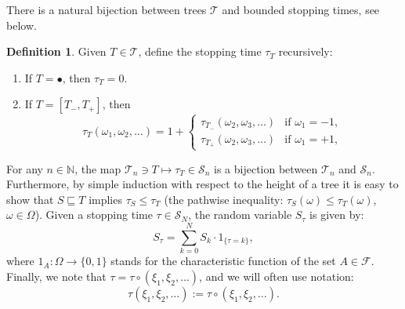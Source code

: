 \documentclass[10pt]{amsart}
\theoremstyle{definition}
\newtheorem{definition}[theorem]{Definition}
\numberwithin{equation}{section}
\newcommand{\N}{\mathbb{N}}
\newcommand{\FF}{\mathcal{F}}
\newcommand{\TT}{\mathcal{T}}
\begin{document}

There is a natural bijection between  trees $\TT$ and bounded stopping times, see below.

\begin{definition}\label{tt}
Given $T \in \TT$, define the stopping time $\tau_T$ recursively:
\begin{enumerate}
\item[\textup{(i)}] If $T = \bullet$, then $\tau_T = 0$.
\item[\textup{(ii)}] If $T = [T_-, T_+]$, then
\[
  \tau_T (\omega_1,\omega_2,\dots)= 1 +
  \begin{cases}
    \tau_{T_-}(\omega_2,\omega_3,\dots)& \text{if } \omega_1 = -1,\\[2pt]
    \tau_{T_+}(\omega_2,\omega_3,\dots) & \text{if } \omega_1 = +1,
  \end{cases}
\]
\end{enumerate}
\end{definition}

 For any $n\in\N$, the map  $\TT_n\ni T \mapsto \tau_T\in\mathcal{S}_n$  is a bijection between $\TT_n$ and $\mathcal{S}_n$. Furthermore, by simple induction with respect to the height of a tree it is easy to show that $S\sqsubseteq T$ implies  $\tau_S\leq\tau_T$ (the pathwise inequality: $\tau_S(\omega)\leq\tau_T(\omega)$, $\omega\in\Omega$).
Given a stopping time $\tau\in \mathcal{S}_N$, the random variable $S_{\tau}$ is given by:
$$S_{\tau}=\sum\limits_{k=0}^{N}S_k\cdot 1_{\{\tau=k\}},$$
where $1_A\colon\Omega\to\{0,1\}$ stands for the characteristic function of  the set $A\in \FF$.
Finally, we note that $\tau=\tau\circ  (\xi_1,\xi_2,\dots)$, and we will often use notation:
$$\tau(\xi_1,\xi_2,\dots):=\tau\circ (\xi_1,\xi_2,\dots).$$
\end{document}
